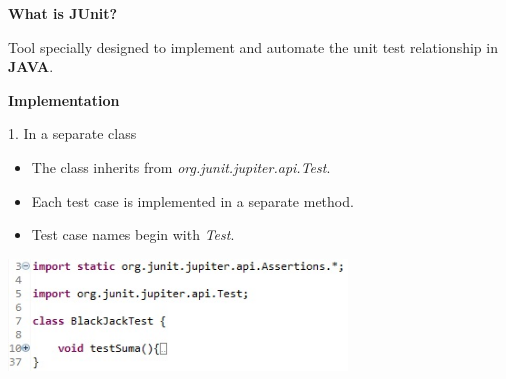 \documentclass[11pt]{beamer}
\begin{document}
\begin{frame}{\textbf{What is JUnit?}}

Tool specially designed to implement and automate the unit test relationship in \textbf{JAVA}.

\end{frame}


\begin{frame}{\textbf{Implementation}}

1. In a separate class
\begin{itemize}
\item The class inherits from \emph{org.junit.jupiter.api.Test}.
\item Each test case is implemented in a separate method.
\item Test case names begin with \emph{Test}.
\end{itemize}

\begin{center}
\includegraphics[width=9.0cm]{img/TestCase.jpg}
\end{center}

\end{frame}

\end{document}
